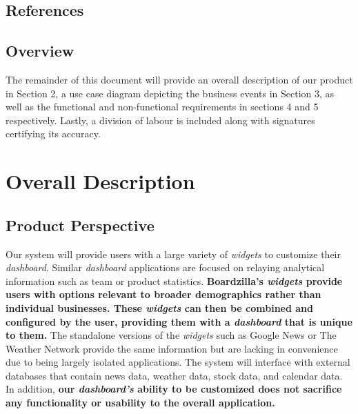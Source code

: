 \documentclass{article}
\begin{document}
	\subsection{References}
	\label{sub:references}
	
	
	\subsection{Overview}
	\label{sub:overview}
	The remainder of this document will provide an overall description of our product in Section 2, a use case diagram depicting the business events in Section 3, as well as the functional and non-functional requirements in sections 4 and 5 respectively. Lastly, a division of labour is included along with signatures certifying its accuracy.
	
	\section{Overall Description}
	\label{sec:overall_description}
	\subsection{Product Perspective}
	\label{sub:product_perspective}
	Our system will provide users with a large variety of \textit{widgets} to customize their \textit{dashboard}. Similar \textit{dashboard} applications are focused on relaying analytical information such as team or product statistics. \textbf{Boardzilla's \textit{widgets} provide users with options relevant to broader demographics rather than individual businesses. These \textit{widgets} can then be combined and configured by the user, providing them with a \textit{dashboard} that is unique to them.} The standalone versions of the \textit{widgets} such as Google News or The Weather Network provide the same information but are lacking in convenience due to being largely isolated applications. The system will interface with external databases that contain news data, weather data, stock data, and calendar data. In addition, \textbf{our \textit{dashboard's} ability to be customized does not sacrifice any functionality or usability to the overall application.}
	
\end{document}

